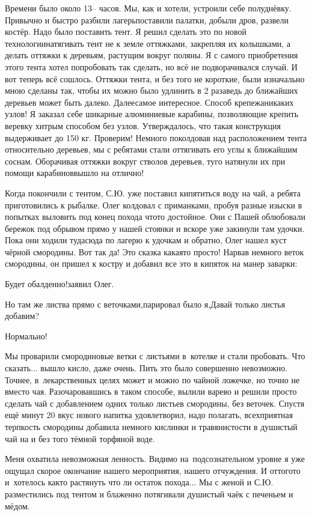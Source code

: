 Времени было около 13\thinspace\nobreakdash-- часов. Мы, как и хотели, устроили себе полуднёвку. Привычно и быстро разбили лагерь\mdash поставили палатки, добыли дров, развели костёр. Надо было поставить тент. Я решил сделать это по новой технологии\mdash натягивать тент не к земле оттяжками, закрепляя их колышками, а делать оттяжки к деревьям, растущим вокруг поляны. Я с самого приобретения этого тента хотел попробовать так сделать, но всё не подворачивался случай. И вот теперь всё сошлось. Оттяжки тента, и без того не короткие, были изначально мною сделаны так, чтобы их можно было удлинить в 2 раза\mdash ведь до ближайших деревьев может быть далеко. Далее\mdash самое интересное. Способ крепежа\mdash никаких узлов! Я заказал себе шикарные алюминиевые карабины, позволяющие крепить веревку хитрым способом без узлов. Утверждалось, что такая конструкция выдерживает до 150 кг. Проверим! Немного поколдовав над расположением тента относительно деревьев, мы с ребятами стали оттягивать его углы к ближайшим соснам. Оборачивая оттяжки вокруг стволов деревьев, туго натянули их при помощи карабинов\mdash вышло на отлично!

Когда покончили с тентом, С.Ю. уже поставил кипятиться воду на чай, а ребята приготовились к рыбалке. Олег колдовал с приманками, пробуя разные изыски в попытках выловить под конец похода что\sdash то достойное. Они с Пашей облюбовали бережок под обрывом прямо у нашей стоянки и вскоре уже закинули там удочки. Пока они ходили туда\sdash сюда по лагерю к удочкам и обратно, Олег нашел куст чёрной смородины. Вот так да! Это сказка какая\sdash то просто! Нарвав немного веток смородины, он пришел к костру и добавил все это в кипяток на манер заварки:

\diagdash Будет обалденно!\mdash заявил Олег.

\diagdash Но там же листва прямо с веточками,\mdash парировал было я,\mdash Давай только листья добавим?

\diagdash Нормально!

Мы проварили смородиновые ветки с листьями в~котелке и стали пробовать. Что сказать$\ldots$ вышло кисло, даже очень. Пить это было совершенно невозможно. Точнее, в~лекарственных целях может и можно по чайной ложечке, но точно не вместо чая. Разочаровавшись в таком способе, вылили варево и решили просто сделать чай с добавлением одних только листьев смородины, без веточек. Спустя ещё минут 20 вкус нового напитка удовлетворил, надо полагать, всех\mdash приятная терпкость смородины добавила немного кислинки и травянистости в душистый чай на и без того тёмной торфяной воде. 

Меня охватила невозможная ленность. Видимо на~подсознательном уровне я уже ощущал скорое окончание нашего мероприятия, нашего отчуждения. И оттого\sdash то и~хотелось как\sdash то растянуть что ли остаток похода$\ldots$ Мы с женой и С.Ю. разместились под тентом и блаженно потягивали душистый чаёк с печеньем и мёдом.

\begin{center}
\end{center}
